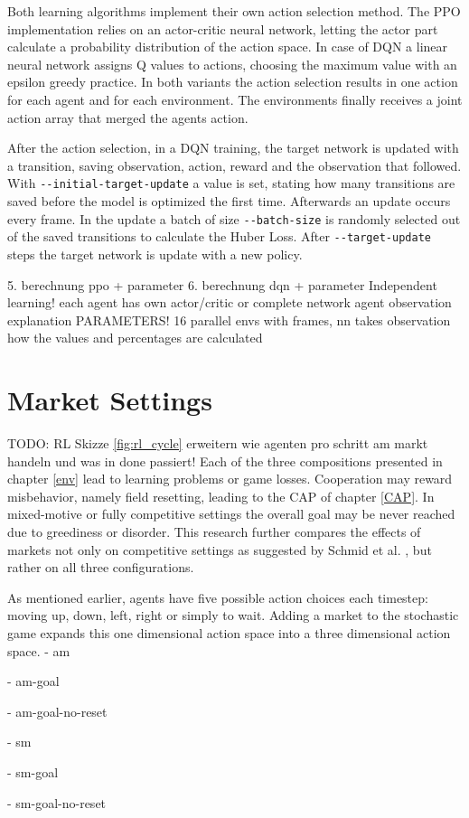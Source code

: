 Both learning algorithms implement their own action selection method. The PPO implementation relies on an actor-critic neural network, letting the actor part calculate a probability distribution of the action space. In case of DQN a linear neural network assigns Q values to actions, choosing the maximum value with an epsilon greedy practice. In both variants the action selection results in one action for each agent and for each environment. The environments finally receives a joint action array that merged the agents action.

After the action selection, in a DQN training, the target network is updated with a transition, saving observation, action, reward and the observation that followed. With \verb|--initial-target-update| a value is set, stating how many transitions are saved before the model is optimized the first time. Afterwards an update occurs every frame. In the update a batch of size \verb|--batch-size| is randomly selected out of the saved transitions to calculate the Huber Loss. After \verb|--target-update| steps the target network is update with a new policy.

5. berechnung ppo + parameter
6. berechnung dqn + parameter
Independent learning! each agent has own actor/critic or complete network
agent observation explanation
PARAMETERS!
16 parallel envs with frames,
nn takes observation
how the values and percentages are calculated

\section{Market Settings}\label{market_settings} %
TODO: RL Skizze \ref{fig:rl_cycle} erweitern wie agenten pro schritt am markt handeln und was in done passiert!
Each of the three compositions presented in chapter \ref{env} lead to learning problems or game losses. Cooperation may reward misbehavior, namely field resetting, leading to the CAP of chapter \ref{CAP}. In mixed-motive or fully competitive settings the overall goal may be never reached due to greediness or disorder. This research further compares the effects of markets not only on competitive settings as suggested by Schmid et al. \cite{scbe21}, but rather on all three configurations.

As mentioned earlier, agents have five possible action choices each timestep: moving up, down, left, right or simply to wait. Adding a market to the stochastic game expands this one dimensional action space into a three dimensional action space.
- am

- am-goal

- am-goal-no-reset

- sm

- sm-goal

- sm-goal-no-reset

